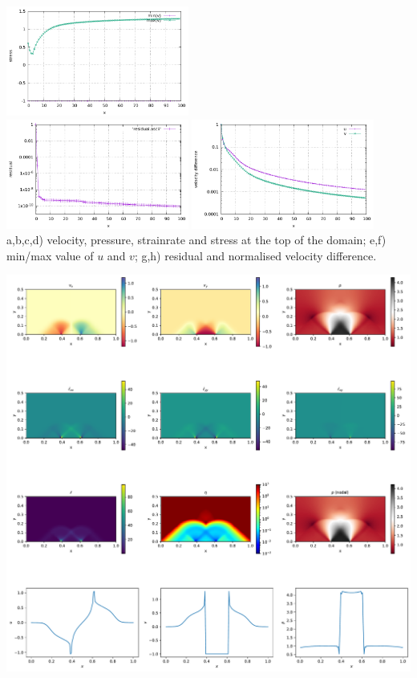 \begin{center}
\includegraphics[width=6cm]{python_codes/fieldstone_08/results/smooth/v_stats.pdf}\\
\includegraphics[width=6cm]{python_codes/fieldstone_08/results/smooth/residual.pdf}
\includegraphics[width=6cm]{python_codes/fieldstone_08/results/smooth/diff_uv.pdf}\\
{\captionfont a,b,c,d) velocity, pressure, strainrate and stress at the top of the domain; 
e,f) min/max value of $u$ and $v$;
g,h) residual and normalised velocity difference.}
\end{center}

\newpage
\includegraphics[width=16cm]{python_codes/fieldstone_08/results/smooth/solution.pdf}




